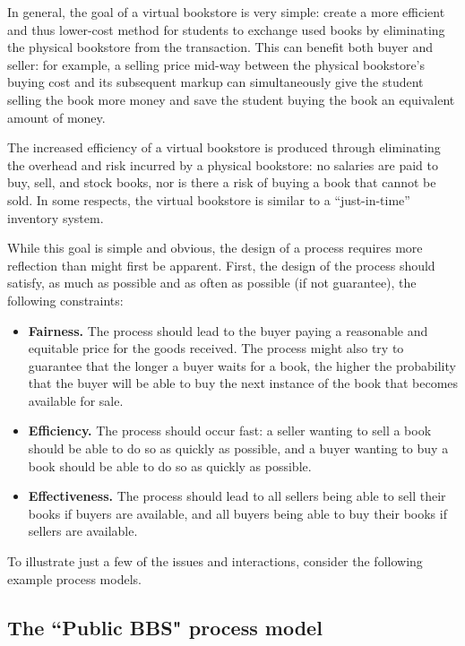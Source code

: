 In general, the goal of a virtual bookstore is very simple: create a more
efficient and thus lower-cost method for students to exchange used books by
eliminating the physical bookstore from the transaction.  This can benefit
both buyer and seller: for example, a selling price mid-way between the
physical bookstore's buying cost and its subsequent markup can
simultaneously give the student selling the book more money and save the
student buying the book an equivalent amount of money.  

The increased efficiency of a virtual bookstore is produced through
eliminating the overhead and risk incurred by a physical bookstore: no
salaries are paid to buy, sell, and stock books, nor is there a risk of
buying a book that cannot be sold.  In some respects, the virtual bookstore
is similar to a ``just-in-time'' inventory system.

While this goal is simple and obvious, the design of a process requires
more reflection than might first be apparent.  First, the design of the
process should satisfy, as much as possible and as often as possible (if
not guarantee), the following constraints:

\begin{itemize}
\item {\bf Fairness.}  The process should lead to the buyer paying a reasonable and
    equitable price for the goods received. The process might also try to
    guarantee that the longer a buyer waits for a book, the higher the
    probability that the buyer will be able to buy the next instance of the
    book that becomes available for sale.

\item {\bf Efficiency.} The process should occur fast: a seller wanting to sell a
    book should be able to do so as quickly as possible, and a buyer
    wanting to buy a book should be able to do so as quickly as possible.

\item {\bf Effectiveness.}  The process should lead to all sellers being able to
    sell their books if buyers are available, and all buyers being able to
    buy their books if sellers are available.
\end{itemize}

To illustrate just a few of the issues and interactions, consider the
following example process models.

\subsection{The ``Public BBS" process model}


